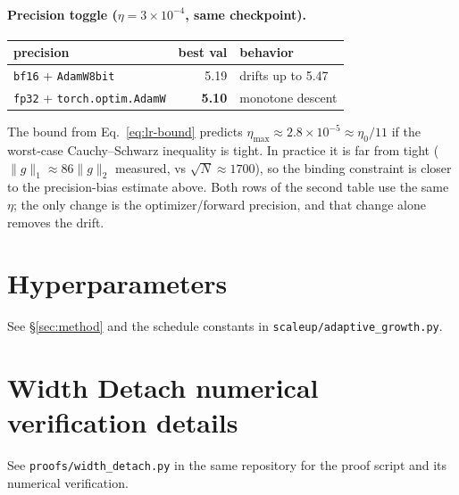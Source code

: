 \documentclass{article}
\begin{document}
\paragraph{Precision toggle ($\eta = 3{\times}10^{-4}$, same checkpoint).}
\begin{center}
\begin{tabular}{l r l}
\toprule
precision & best val & behavior \\
\midrule
\texttt{bf16} + \texttt{AdamW8bit} & 5.19 & drifts up to 5.47 \\
\texttt{fp32} + \texttt{torch.optim.AdamW} & \textbf{5.10} & monotone descent \\
\bottomrule
\end{tabular}
\end{center}

The bound from Eq.~\ref{eq:lr-bound} predicts
$\eta_{\max} \approx 2.8{\times}10^{-5} \approx \eta_0/11$ if the
worst-case Cauchy--Schwarz inequality is tight.  In practice it is far
from tight ($\|g\|_1 \approx 86 \|g\|_2$ measured, vs $\sqrt{N} \approx
1700$), so the binding constraint is closer to the precision-bias
estimate above.  Both rows of the second table use the same $\eta$; the
only change is the optimizer/forward precision, and that change alone
removes the drift.

\section{Hyperparameters}
\label{app:hyperparams}
See \S\ref{sec:method} and the schedule constants in
\texttt{scaleup/adaptive\_growth.py}.

\section{Width Detach numerical verification details}
See \texttt{proofs/width\_detach.py} in the same repository for the proof
script and its numerical verification.
\end{document}
